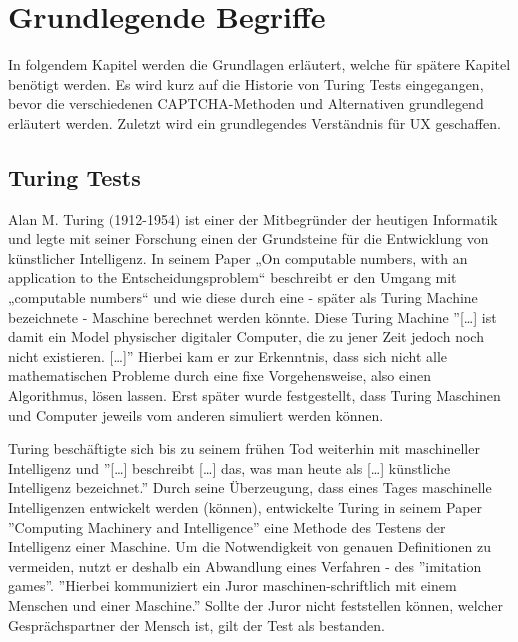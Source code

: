 \chapter{Grundlegende Begriffe}
\label{ch:basics}
In folgendem Kapitel werden die Grundlagen erläutert, welche für spätere Kapitel benötigt werden. 
Es wird kurz auf die Historie von Turing Tests eingegangen, 
bevor die verschiedenen CAPTCHA-Methoden und Alternativen grundlegend erläutert werden. 
Zuletzt wird ein grundlegendes Verständnis für UX geschaffen.

\section{Turing Tests}
\label{ch:basics:turing}
Alan M. Turing $($1912-1954$)$ ist einer der Mitbegründer der heutigen Informatik 
und legte mit seiner Forschung einen der Grundsteine für die Entwicklung von künstlicher Intelligenz. 
In seinem Paper „On computable numbers, with an application to the Entscheidungsproblem“ \cite{turing} 
beschreibt er den Umgang mit „computable numbers“ und wie diese durch eine - später als Turing Machine bezeichnete - Maschine berechnet werden könnte.
Diese Turing Machine ''[\dots] ist damit ein Model physischer digitaler Computer, die zu jener Zeit jedoch noch nicht existieren. [\dots]'' \cite[p.4]{pallay2020turing}
Hierbei kam er zur Erkenntnis, dass sich nicht alle mathematischen Probleme durch eine fixe Vorgehensweise, also einen Algorithmus, lösen lassen. 
Erst später wurde festgestellt, dass Turing Maschinen und Computer jeweils vom anderen simuliert werden können. \cite[p.647]{geniusofturing} \cite[p.4]{pallay2020turing} %

Turing beschäftigte sich bis zu seinem frühen Tod weiterhin mit maschineller Intelligenz 
und ''[\dots] beschreibt [\dots] das, was man heute als [\dots] künstliche Intelligenz bezeichnet.'' \cite[p.10]{pallay2020turing}
Durch seine Überzeugung, dass eines Tages maschinelle Intelligenzen entwickelt werden (können), 
entwickelte Turing in seinem Paper ''Computing Machinery and Intelligence'' \cite[p.23ff]{turing2009computing} 
eine Methode des Testens der Intelligenz einer Maschine. 
Um die Notwendigkeit von genauen Definitionen zu vermeiden, nutzt er deshalb ein Abwandlung eines Verfahren - des ''imitation games''. 
''Hierbei kommuniziert ein Juror maschinen-schriftlich mit einem Menschen und einer Maschine.'' \cite[p.12]{pallay2020turing}
Sollte der Juror nicht feststellen können, welcher Gesprächspartner der Mensch ist, gilt der Test als bestanden. \cite[p.11ff]{pallay2020turing}

